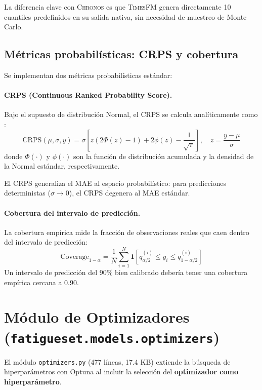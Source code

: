 \documentclass[12pt, a4paper]{article}
\newcommand{\code}[1]{\texttt{#1}}
\newcommand{\chronos}{\textsc{Chronos}}
\newcommand{\timesfm}{\textsc{TimesFM}}
\begin{document}
La diferencia clave con \chronos{} es que \timesfm{} genera directamente 10 cuantiles predefinidos en su salida nativa, sin necesidad de muestreo de Monte Carlo.


\subsection{Métricas probabilísticas: CRPS y cobertura}

Se implementan dos métricas probabilísticas estándar:

\paragraph{CRPS (Continuous Ranked Probability Score).}
Bajo el supuesto de distribución Normal, el CRPS se calcula analíticamente como \cite{gneiting2007scoring}:
\[
\text{CRPS}(\mu, \sigma, y) = \sigma \left[ z (2\Phi(z) - 1) + 2\phi(z) - \frac{1}{\sqrt{\pi}} \right], \quad z = \frac{y - \mu}{\sigma}
\]
donde $\Phi(\cdot)$ y $\phi(\cdot)$ son la función de distribución acumulada y la densidad de la Normal estándar, respectivamente.

El CRPS generaliza el MAE al espacio probabilístico: para predicciones deterministas ($\sigma \to 0$), el CRPS degenera al MAE estándar.

\paragraph{Cobertura del intervalo de predicción.}
La cobertura empírica mide la fracción de observaciones reales que caen dentro del intervalo de predicción:
\[
\text{Coverage}_{1-\alpha} = \frac{1}{N} \sum_{i=1}^{N} \mathbf{1}\left[ q_{\alpha/2}^{(i)} \leq y_i \leq q_{1-\alpha/2}^{(i)} \right]
\]
Un intervalo de predicción del 90\% bien calibrado debería tener una cobertura empírica cercana a 0.90.


\section{Módulo de Optimizadores (\code{fatigueset.models.optimizers})}
\label{sec:optimizers}

El módulo \code{optimizers.py} (477 líneas, 17.4 KB) extiende la búsqueda de hiperparámetros con Optuna al incluir la selección del \textbf{optimizador como hiperparámetro}.
\end{document}
